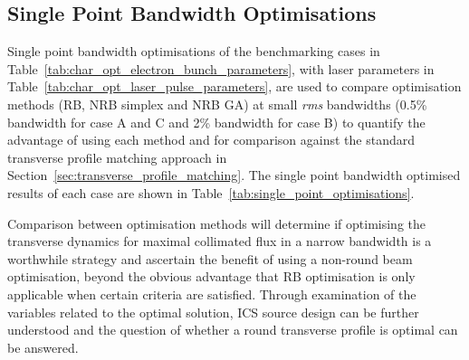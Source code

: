 \documentclass[../main.tex]{subfiles}
\begin{document}
\subsection{Single Point Bandwidth Optimisations}

Single point bandwidth optimisations of the benchmarking cases in Table~\ref{tab:char_opt_electron_bunch_parameters}, with laser parameters in Table~\ref{tab:char_opt_laser_pulse_parameters}, are used to compare optimisation methods (RB, NRB simplex and NRB GA) at small \textit{rms} bandwidths (0.5\%  bandwidth for case A and C and 2\%  bandwidth for case B) to quantify the advantage of using each method and for comparison against the standard transverse profile matching approach in Section~\ref{sec:transverse_profile_matching}. The single point bandwidth optimised results of each case are shown in Table~\ref{tab:single_point_optimisations}. 

Comparison between optimisation methods will determine if optimising the transverse dynamics for maximal collimated flux in a narrow bandwidth is a worthwhile strategy and ascertain the benefit of using a non-round beam optimisation, beyond the obvious advantage that RB optimisation is only applicable when certain criteria are satisfied. Through examination of the variables related to the optimal solution, ICS source design can be further understood and the question of whether a round transverse profile is optimal can be answered.      
\end{document}
